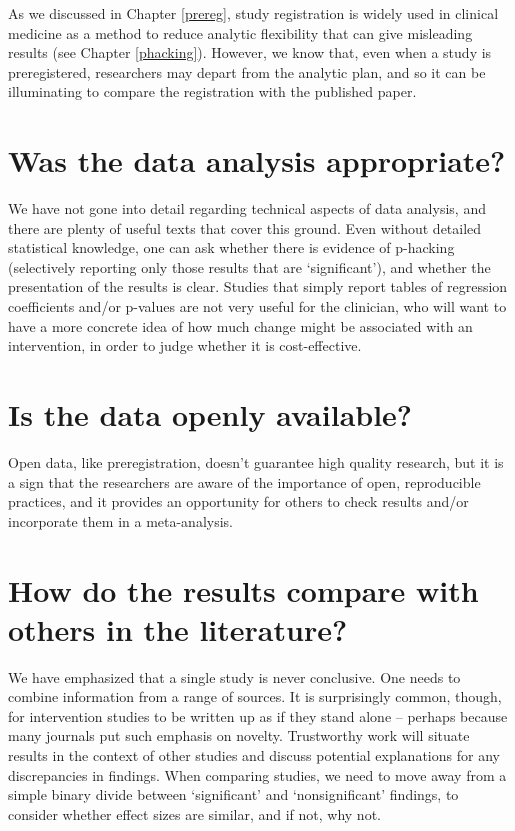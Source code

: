 \documentclass{krantz}
\begin{document}
As we discussed in Chapter \ref{prereg}, study registration is widely used in clinical medicine as a method to reduce analytic flexibility that can give misleading results (see Chapter \ref{phacking}). However, we know that, even when a study is preregistered, researchers may depart from the analytic plan, and so it can be illuminating to compare the registration with the published paper.
\hypertarget{was-the-data-analysis-appropriate}{%
\section{Was the data analysis appropriate?}\label{was-the-data-analysis-appropriate}}

We have not gone into detail regarding technical aspects of data analysis, and there are plenty of useful texts that cover this ground. Even without detailed statistical knowledge, one can ask whether there is evidence of p-hacking (selectively reporting only those results that are `significant'), and whether the presentation of the results is clear. Studies that simply report tables of regression coefficients and/or p-values are not very useful for the clinician, who will want to have a more concrete idea of how much change might be associated with an intervention, in order to judge whether it is cost-effective.

\hypertarget{is-the-data-openly-available}{%
\section{Is the data openly available?}\label{is-the-data-openly-available}}

Open data, like preregistration, doesn't guarantee high quality research, but it is a sign that the researchers are aware of the importance of open, reproducible practices, and it provides an opportunity for others to check results and/or incorporate them in a meta-analysis.

\hypertarget{how-do-the-results-compare-with-others-in-the-literature}{%
\section{How do the results compare with others in the literature?}\label{how-do-the-results-compare-with-others-in-the-literature}}

We have emphasized that a single study is never conclusive. One needs to combine information from a range of sources. It is surprisingly common, though, for intervention studies to be written up as if they stand alone -- perhaps because many journals put such emphasis on novelty. Trustworthy work will situate results in the context of other studies and discuss potential explanations for any discrepancies in findings. When comparing studies, we need to move away from a simple binary divide between `significant' and `nonsignificant' findings, to consider whether effect sizes are similar, and if not, why not.
\end{document}
